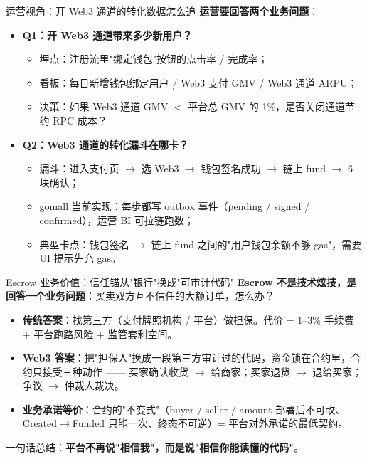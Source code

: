 \documentclass[aspectratio=169,11pt]{beamer}
\begin{document}
\begin{frame}[shrink]{运营视角：开 Web3 通道的转化数据怎么追}
\textbf{运营要回答两个业务问题}：
\begin{itemize}
  \item \textbf{Q1：开 Web3 通道带来多少新用户？}
  \begin{itemize}
    \item 埋点：注册流里"绑定钱包"按钮的点击率 / 完成率；
    \item 看板：每日新增钱包绑定用户 / Web3 支付 GMV / Web3 通道 ARPU；
    \item 决策：如果 Web3 通道 GMV $<$ 平台总 GMV 的 1\%，是否关闭通道节约 RPC 成本？
  \end{itemize}
  \item \textbf{Q2：Web3 通道的转化漏斗在哪卡？}
  \begin{itemize}
    \item 漏斗：进入支付页 $\to$ 选 Web3 $\to$ 钱包签名成功 $\to$ 链上 fund $\to$ 6 块确认；
    \item gomall 当前实现：每步都写 outbox 事件（pending / signed / confirmed），运营 BI 可拉链跑数；
    \item 典型卡点：钱包签名 $\to$ 链上 fund 之间的"用户钱包余额不够 gas"，需要 UI 提示先充 gas。
  \end{itemize}
\end{itemize}
\end{frame}

\begin{frame}[shrink]{Escrow 业务价值：信任锚从"银行"换成"可审计代码"}
\textbf{Escrow 不是技术炫技，是回答一个业务问题}：买卖双方互不信任的大额订单，怎么办？
\begin{itemize}
  \item \textbf{传统答案}：找第三方（支付牌照机构 / 平台）做担保。代价 = 1--3\% 手续费 + 平台跑路风险 + 监管套利空间。
  \item \textbf{Web3 答案}：把"担保人"换成一段第三方审计过的代码，资金锁在合约里，合约只接受三种动作 —— 买家确认收货 $\to$ 给商家；买家退货 $\to$ 退给买家；争议 $\to$ 仲裁人裁决。
  \item \textbf{业务承诺等价}：合约的"不变式"（buyer / seller / amount 部署后不可改、Created$\to$Funded 只能一次、终态不可逆）= 平台对外承诺的最低契约。
\end{itemize}
\vspace{1mm}
\small 一句话总结：\textbf{平台不再说"相信我"，而是说"相信你能读懂的代码"}。
\end{frame}
\end{document}
